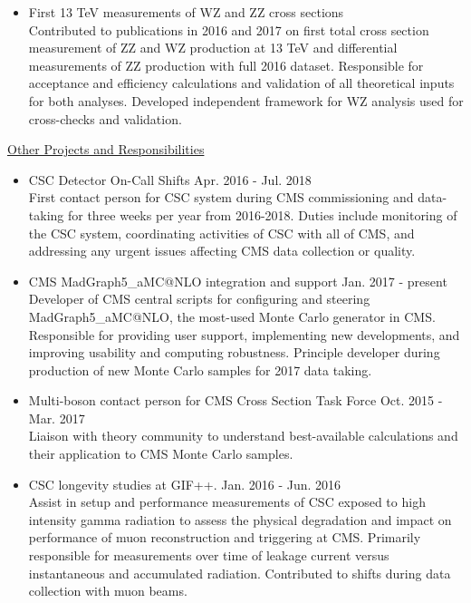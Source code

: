 \documentclass[10pt]{res} %
\begin{document}
\begin{resume}
\begin{itemize}
  \item{First 13 TeV measurements of WZ and ZZ cross sections} \\
    Contributed to publications in 2016 and 2017 on first total cross section measurement 
    of ZZ and WZ production at 13 TeV and differential measurements of ZZ production with full 2016 dataset. 
    Responsible for acceptance
    and efficiency calculations and validation of all theoretical inputs for both analyses. 
    Developed independent framework for WZ analysis used for cross-checks and validation.

\end{itemize}

\underline{Other Projects and Responsibilities}
\vspace{2mm}
\begin{itemize}
  \item CSC Detector On-Call Shifts \hfill{Apr. 2016 - Jul. 2018} \\
    First contact person for CSC system during CMS commissioning and data-taking for three weeks per year
    from 2016-2018. Duties include monitoring of the CSC system, coordinating activities of CSC with all of CMS, 
    and addressing any urgent issues affecting CMS data collection or quality.

  \item CMS MadGraph5\_aMC@NLO integration and support \hfill{Jan. 2017 - present} \\
    Developer of CMS central scripts
    for configuring and steering MadGraph5\_aMC@NLO, the most-used Monte Carlo generator in CMS. Responsible for 
    providing user support, implementing new developments, 
    and improving usability and computing robustness. Principle developer during production
    of new Monte Carlo samples for 2017 data taking.

  \item Multi-boson contact person for CMS Cross Section Task Force \hfill{Oct. 2015 - Mar. 2017} \\
    Liaison with theory community to understand best-available calculations and 
    their application to CMS Monte Carlo samples. 

  \item CSC longevity studies at GIF++. \hfill{Jan. 2016 - Jun. 2016} \\
    Assist in setup and performance measurements
    of CSC exposed to high intensity gamma radiation to assess the physical degradation and impact on performance
    of muon reconstruction and triggering at CMS. Primarily responsible for measurements over time of leakage current
    versus instantaneous and accumulated radiation. Contributed to shifts during data collection with muon beams.
\end{itemize}


\end{resume}
\end{document}
